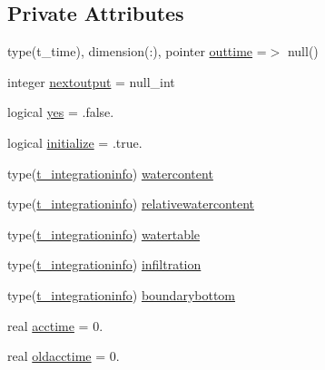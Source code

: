 \subsection*{Private Attributes}
\begin{DoxyCompactItemize}
\item 
type(t\+\_\+time), dimension(\+:), pointer \mbox{\hyperlink{structmoduleporousmedia_1_1t__integrationoutput_a3c3da341bdbf2d08754799160ef926a2}{outtime}} =$>$ null()
\item 
integer \mbox{\hyperlink{structmoduleporousmedia_1_1t__integrationoutput_ab1ccc97d5d9fb2e10962835766cc0616}{nextoutput}} = null\+\_\+int
\item 
logical \mbox{\hyperlink{structmoduleporousmedia_1_1t__integrationoutput_a9c27624e3a70523b265d629c8d04de75}{yes}} = .false.
\item 
logical \mbox{\hyperlink{structmoduleporousmedia_1_1t__integrationoutput_ae51a87e03d967bc72e7c4560a10c1d14}{initialize}} = .true.
\item 
type(\mbox{\hyperlink{structmoduleporousmedia_1_1t__integrationinfo}{t\+\_\+integrationinfo}}) \mbox{\hyperlink{structmoduleporousmedia_1_1t__integrationoutput_ab6b07b3cd889f828dd27f245b111adb3}{watercontent}}
\item 
type(\mbox{\hyperlink{structmoduleporousmedia_1_1t__integrationinfo}{t\+\_\+integrationinfo}}) \mbox{\hyperlink{structmoduleporousmedia_1_1t__integrationoutput_aad48ca1e6b7e8a7c6721b4eec259ff9e}{relativewatercontent}}
\item 
type(\mbox{\hyperlink{structmoduleporousmedia_1_1t__integrationinfo}{t\+\_\+integrationinfo}}) \mbox{\hyperlink{structmoduleporousmedia_1_1t__integrationoutput_a905559351eabb1f85a12fbd0e0b19ecb}{watertable}}
\item 
type(\mbox{\hyperlink{structmoduleporousmedia_1_1t__integrationinfo}{t\+\_\+integrationinfo}}) \mbox{\hyperlink{structmoduleporousmedia_1_1t__integrationoutput_abef5579ae12635f8a1d42d236b9ecbb1}{infiltration}}
\item 
type(\mbox{\hyperlink{structmoduleporousmedia_1_1t__integrationinfo}{t\+\_\+integrationinfo}}) \mbox{\hyperlink{structmoduleporousmedia_1_1t__integrationoutput_a6443125d56b07edb1899d6450839b5ae}{boundarybottom}}
\item 
real \mbox{\hyperlink{structmoduleporousmedia_1_1t__integrationoutput_a08100b0abca12866fac4bf98307af3e9}{acctime}} = 0.
\item 
real \mbox{\hyperlink{structmoduleporousmedia_1_1t__integrationoutput_afb8a2cf3bb405e5acfc4288f60539b72}{oldacctime}} = 0.
\end{DoxyCompactItemize}


